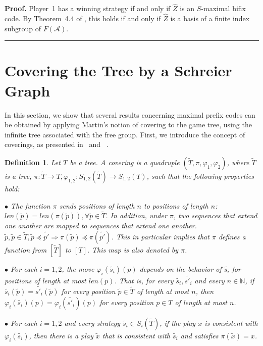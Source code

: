 \documentclass[a4,12pt]{article}%
\newtheorem{definition}[theorem]{Definition}
\newenvironment{proof}[1][Proof]{\textbf{#1.} }{\ \rule{0.5em}{0.5em}}
\newcommand{\N}{\mathbb{N}}
\begin{document}
\begin{proof}
Player~1 has a winning strategy if and only if $\hat{Z}$ is an $S$-maximal bifix code. By Theorem~4.4 of \cite{FiniteIndexProperty}, this holds if and only if $\hat{Z}$ is a basis of a finite index subgroup of $F(\mathcal{A})$.
\end{proof}

\section{Covering the Tree by a Schreier Graph} \label{section:coverings}

In this section, we show that several results concerning maximal prefix codes can be obtained by applying Martin’s notion of covering to the game tree, using the infinite tree associated with the free group.
First, we introduce the concept of coverings, as presented in~\cite{Solan} and ~\cite{MartinCovering}.
\begin{definition}
    Let $T$ be a tree. A \emph{covering} is a quadruple $(\tilde{T} , \pi, \varphi_1
, \varphi_2)$, where $\tilde{T}$ is a tree, $\pi : \tilde{T} \to T, \varphi_{1,2}
: S_{1,2}(\tilde{T}) \to S_{1,2}(T)$, such that the following properties hold:

$\bullet$ The function $\pi$ sends positions of length $n$ to positions of length $n$:
 $len(\tilde{p}) = len(\pi(\tilde{p})), \forall \tilde{p} \in \tilde{T}$.
In addition, under $\pi$, two sequences that extend one another are mapped
to sequences that extend one another.
$\tilde{p},\tilde{p} \in \tilde{T} , \tilde{p} \preceq \tilde{p'} \Rightarrow \pi(\tilde{p}) \preceq \pi(\tilde{p'})$.
This in particular implies that $\pi$ defines a function from $[\tilde{T}]$ to $[T]$.
This map is also denoted by $\pi$.

$\bullet$ For each $i = 1,2$, the move $\varphi_i(\tilde{s_i})(p)$ depends on the behavior of $\tilde{s_i}$ for
positions of length at most $len(p)$. That is, for every $\tilde{s_i} , \tilde{s'_i}$ and
every $n \in \N$, if $\tilde{s_i}(\tilde{p}) = \tilde{s'_i}(\tilde{p})$ for every position $\tilde{p} \in \tilde{T}$ of length at most
$n$, then $\varphi_i(\tilde{s_i})(p) = \varphi_i(\tilde{s'_i}
)(p)$ for every position $p \in T$ of length at most
$n$.

$\bullet$ For each $i = 1,2$ and every strategy $\tilde{s_i} \in S_i(\tilde{T})$, if the play $x$ is consistent with $\varphi_i(\tilde{s_i})$, then there is a play $\tilde{x}$ that is consistent with $\tilde{s_i}$ and
satisfies $\pi(\tilde{x}) = x$.
\end{definition}
\end{document}
